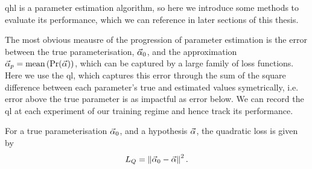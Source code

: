 \gls{qhl} is a parameter estimation algorithm, so here we introduce some methods to evaluate its performance, 
    which we can reference in later sections of this thesis. 
\par 
The most obvious meausre of the progression of parameter estimation is the error between the true parameterisation, 
    $\vec{\alpha}_0$, and the approximation $\vec{\alpha}_p = \textrm{mean} \left( \Pr(\vec{\alpha}) \right)$,
    which can be captured by a large family of loss functions. 
Here we use the \gls{ql}, which captures this error through the sum of the square difference between 
    each parameter's true and estimated values symetrically, 
    i.e. error above the true parameter is as impactful as error below. 
We can record the \gls{ql} at each experiment of our training regime and hence track its performance. 
\begin{definition}
    \label{def:quadratic_loss}
    For a true parameterisation $\vec{\alpha}_0$, and a hypothesis $\vec{\alpha}$, the quadratic loss is given by
    \begin{equation}
        \label{eqn:quadratic_loss}
        L_{Q} = \left\| \vec{\alpha}_0 - \vec{\alpha} \right\|^2.
    \end{equation}
\end{definition}
\par 

